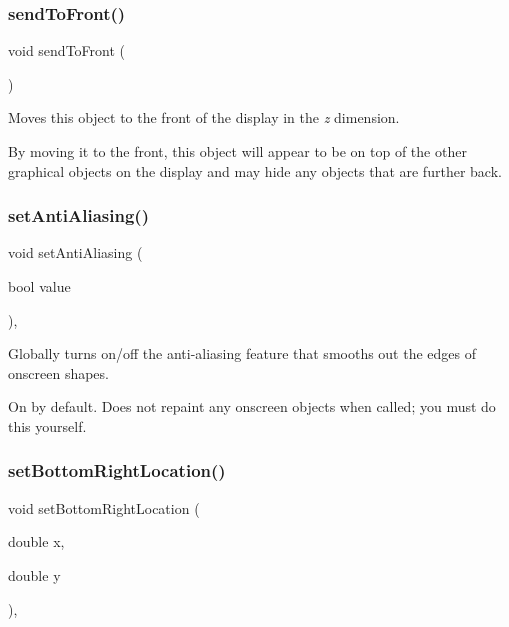 \subsubsection{\texorpdfstring{send\+To\+Front()}{sendToFront()}}
{\footnotesize\ttfamily void send\+To\+Front (\begin{DoxyParamCaption}{ }\end{DoxyParamCaption})\hspace{0.3cm}{\ttfamily [inherited]}}



Moves this object to the front of the display in the {\itshape z} dimension. 

By moving it to the front, this object will appear to be on top of the other graphical objects on the display and may hide any objects that are further back. \mbox{\label{classsgl_1_1GObject_a1e43371668ae850193cebedb44e1bbe3}} 
\subsubsection{\texorpdfstring{set\+Anti\+Aliasing()}{setAntiAliasing()}}
{\footnotesize\ttfamily void set\+Anti\+Aliasing (\begin{DoxyParamCaption}\item[{bool}]{value }\end{DoxyParamCaption})\hspace{0.3cm}{\ttfamily [static]}, {\ttfamily [inherited]}}



Globally turns on/off the anti-\/aliasing feature that smooths out the edges of onscreen shapes. 

On by default. Does not repaint any onscreen objects when called; you must do this yourself. \mbox{\label{classsgl_1_1GObject_a71ff7b16b8f1bdc4a1ce9f30cf8b87d8}} 
\subsubsection{\texorpdfstring{set\+Bottom\+Right\+Location()}{setBottomRightLocation()}\hspace{0.1cm}{\footnotesize\ttfamily [1/2]}}
{\footnotesize\ttfamily void set\+Bottom\+Right\+Location (\begin{DoxyParamCaption}\item[{double}]{x,  }\item[{double}]{y }\end{DoxyParamCaption})\hspace{0.3cm}{\ttfamily [virtual]}, {\ttfamily [inherited]}}



